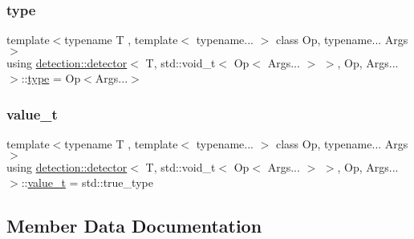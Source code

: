 \subsubsection{\texorpdfstring{type}{type}}
{\footnotesize\ttfamily template$<$typename T , template$<$ typename... $>$ class Op, typename... Args$>$ \\
using \hyperlink{structdetection_1_1detector}{detection\+::detector}$<$ T, std\+::void\+\_\+t$<$ Op$<$ Args... $>$ $>$, Op, Args... $>$\+::\hyperlink{structdetection_1_1detector_3_01_t_00_01std_1_1void__t_3_01_op_3_01_args_8_8_8_01_4_01_4_00_01_op_00_01_args_8_8_8_01_4_af2ff6315eed30c25ddcc2ad5c56c4f3e}{type} =  Op$<$Args...$>$}

\mbox{\label{structdetection_1_1detector_3_01_t_00_01std_1_1void__t_3_01_op_3_01_args_8_8_8_01_4_01_4_00_01_op_00_01_args_8_8_8_01_4_a79dba66a2b28306ae81d4503850baa23}} 
\subsubsection{\texorpdfstring{value\+\_\+t}{value\_t}}
{\footnotesize\ttfamily template$<$typename T , template$<$ typename... $>$ class Op, typename... Args$>$ \\
using \hyperlink{structdetection_1_1detector}{detection\+::detector}$<$ T, std\+::void\+\_\+t$<$ Op$<$ Args... $>$ $>$, Op, Args... $>$\+::\hyperlink{structdetection_1_1detector_3_01_t_00_01std_1_1void__t_3_01_op_3_01_args_8_8_8_01_4_01_4_00_01_op_00_01_args_8_8_8_01_4_a79dba66a2b28306ae81d4503850baa23}{value\+\_\+t} =  std\+::true\+\_\+type}



\subsection{Member Data Documentation}
\mbox{\label{structdetection_1_1detector_3_01_t_00_01std_1_1void__t_3_01_op_3_01_args_8_8_8_01_4_01_4_00_01_op_00_01_args_8_8_8_01_4_a13a4f41e748fa0a5a4a1cd058d9599f7}} 
